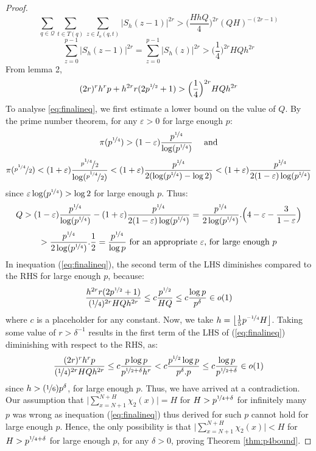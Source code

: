 \documentclass{report}
\begin{document}
\begin{proof}
$$\sum_{q\in\mathcal{Q}}\sum\limits_{t\in T(q)}\sum\limits_{z\in I_o(q,t)}\lvert S_h(z-1) \rvert^{2r} > \Big( \frac{HhQ}{4}\Big)^{2r}(QH)^{-(2r-1)}$$
$$\sum\limits_{z=0}^{p-1}\lvert S_h(z-1) \rvert^{2r} = \sum\limits_{z=0}^{p-1}\lvert S_h(z) \rvert^{2r}>\Big(\frac{1}{4}\Big)^{2r}HQh^{2r}$$
From lemma 2,
\begin{equation} \label{eq:finalineq}
(2r)^{r}h^{r}p+h^{2r}r(2p^{\nicefrac{1}{2}}+1)>\Big(\frac{1}{4}\Big)^{2r}HQh^{2r}
\end{equation}
To analyse \ref{eq:finalineq}, we first estimate a lower bound on the value of $Q$. By the prime number theorem, for any $\varepsilon>0$ for large enough $p$:
\[\pi(p^{\nicefrac{1}{4}}) > (1-\varepsilon)\frac{p^{\nicefrac{1}{4}}}{\log (p^{\nicefrac{1}{4}})}\quad\text { and}\]
\[\pi(\nicefrac{p^{\nicefrac{1}{4}}}{2}) < (1+\varepsilon)\frac{\nicefrac{p^{\nicefrac{1}{4}}}{2}}{\log (\nicefrac {p^{\nicefrac{1}{4}}}{2})} < (1+\varepsilon)\frac{p^{\nicefrac{1}{4}}}{2(\log (p^{\nicefrac{1}{4}}) - \log 2)} < (1+\varepsilon)\frac{p^{\nicefrac{1}{4}}}{2(1-\varepsilon)\log (p^{\nicefrac{1}{4}})}\]
since $\varepsilon\log (p^{\nicefrac{1}{4}}) > \log 2$ for large enough $p$. Thus:
\[Q > (1-\varepsilon)\frac{p^{\nicefrac{1}{4}}}{\log (p^{\nicefrac{1}{4}})} - (1+\varepsilon) \frac {p^{\nicefrac {1}{4}}} {2(1-\varepsilon)\log (p^{\nicefrac{1}{4}})} = \frac {p^{\nicefrac {1}{4}}}{2 \log (p^{\nicefrac {1}{4}})}.\Big(4-\varepsilon-\frac{3}{1-\varepsilon}\Big)\]
\[ > \frac {p^{\nicefrac {1}{4}}}{2 \log (p^{\nicefrac {1}{4}})}.\frac {1}{2} = \frac {p^{\nicefrac {1}{4}}}{\log p} \text { for an appropriate }\varepsilon \text {, for large enough }p\]
In inequation (\ref{eq:finalineq}), the second term of the LHS diminishes compared to the RHS for large enough $p$, because:
\[ \frac{h^{2r}r(2p^{\nicefrac{1}{2}}+1)}{(\nicefrac{1}{4})^{2r}HQh^{2r}} \leq c\frac{p^{\nicefrac{1}{2}}}{HQ} \leq c\frac{\log p}{p^{\delta}} \in o(1)\]
where $c$ is a placeholder for any constant. Now, we take $h=\left \lfloor \frac{1}{5}p^{\nicefrac{-1}{4}}H \right \rfloor$. Taking some value of $r>\delta^{-1}$ results in the first term of the LHS of (\ref{eq:finalineq}) diminishing with respect to the RHS, as:
\[\frac{(2r)^{r}h^{r}p}{(\nicefrac{1}{4})^{2r}HQh^{2r}} \leq c \frac{p\log p}{p^{\nicefrac{1}{2}+\delta}h^r} < c\frac{p^{\nicefrac{1}{2}}\log p}{p^{\delta}.p} \leq c\frac{\log p}{p^{\nicefrac{1}{2}+\delta}} \in o(1)\]
since $h>(\nicefrac{1}{6})p^{\delta}$, for large enough $p$. Thus, we have arrived at a contradiction. Our assumption that $\Big \lvert \sum\limits_{x=N+1}^{N+H}\chi_2(x)\Big \rvert=H$ for $H>p^{\nicefrac{1}{4}+\delta}$ for infinitely many $p$ was wrong as inequation (\ref{eq:finalineq}) thus derived for such $p$ cannot hold for large enough $p$. Hence, the only possibility is that $\Big \lvert \sum\limits_{x=N+1}^{N+H}\chi_2(x)\Big \rvert<H$ for $H>p^{\nicefrac{1}{4}+\delta}$ for large enough $p$, for any $\delta>0$, proving Theorem \ref{thm:p4bound}.
\end{proof}
%
%
\end{document}
